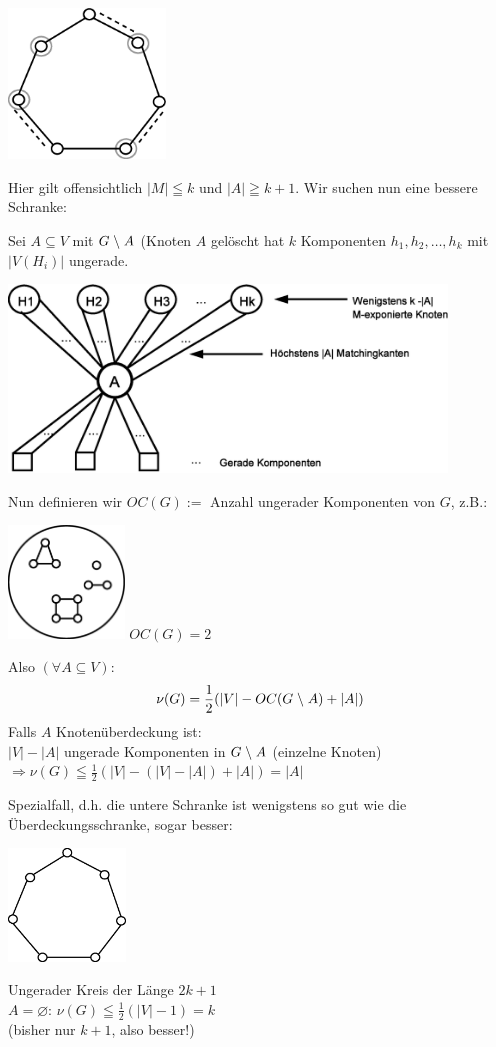 \includegraphics[height=4cm]{bilder/5-1UngerKreis}

Hier gilt offensichtlich $|M| \leqq k$ und $|A| \geqq k+1$. Wir suchen nun
eine bessere Schranke:

Sei $A\subseteq V$ mit $G\;\backslash\; A$ (Knoten $A$ gelöscht hat $k$ Komponenten
$h_1, h_2,\ldots,h_k$ mit $|V(H_i)|$ ungerade. 

\includegraphics[height=5cm]{bilder/5-1ARausgenommen}

Nun definieren wir $OC(G) := $ Anzahl ungerader Komponenten von $G$, z.B.:

\includegraphics[height=3cm]{bilder/5-1AnzUngKomp} \hspace{5mm} $OC(G)=2$

Also $(\forall A \subseteq V)$:
\[\nu(G) = \frac{1}{2} (|V| - OC(G\;\backslash\; A) + |A|)\]
Falls $A$ Knotenüberdeckung ist:\\
$|V| -|A|$ ungerade Komponenten in $G\;\backslash\; A$ (einzelne Knoten)\\
$\Rightarrow \nu(G) \leqq \frac{1}{2} (|V| - (|V| - |A|) + |A|) = |A|$

Spezialfall, d.h. die untere Schranke ist wenigstens so gut wie die
Überdeckungsschranke, sogar besser:

\includegraphics[height=3cm]{bilder/5-1UngerKreis2}\hspace{5mm} 
\parbox[b]{10cm}{Ungerader Kreis der
Länge $2k+1$\\$A = \varnothing$: $\nu(G) \leqq \frac{1}{2}(|V|-1) = k$\\
(bisher nur $k+1$, also besser!)}


